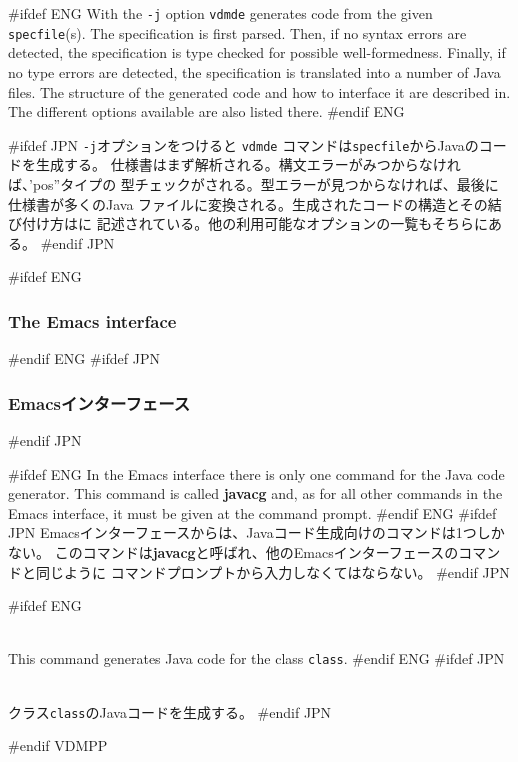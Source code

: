 \documentclass[\pformat,12pt]{article}
\newcommand{\vdmde}{vdmde}
\newcommand{\vdmde}{vppde}
\begin{document}
#ifdef ENG
With the {\tt -j} option {\tt \vdmde} generates code from the given
{\tt specfile}(s). The specification is first parsed. Then, if no
syntax errors are detected, the specification is type checked for
possible well-formedness. Finally,
if no type errors are detected, the specification is translated into a
number of Java files. The structure of the generated
code and how to interface it are described in\cite{CGJavaManPP-CSK}. The
different options available are also listed there.
#endif ENG

#ifdef JPN
{\tt -j}オプションをつけると {\tt \vdmde} コマンドは{\tt specfile}からJavaのコードを生成する。
仕様書はまず解析される。構文エラーがみつからなければ、'pos''タイプの 
型チェックがされる。型エラーが見つからなければ、最後に仕様書が多くのJava
ファイルに変換される。生成されたコードの構造とその結び付け方は\cite{CGJavaManPP-CSK}に
記述されている。他の利用可能なオプションの一覧もそちらにある。
#endif JPN

#ifdef ENG
\subsubsection{The Emacs interface}
#endif ENG
#ifdef JPN
\subsubsection{Emacsインターフェース}
#endif JPN

#ifdef ENG
In the Emacs interface there is only one command for the Java code generator.
This command is called \textbf{javacg}
and, as for all other commands in the Emacs interface, it must be given at
the command prompt.
#endif ENG
#ifdef JPN
Emacsインターフェースからは、Javaコード生成向けのコマンドは1つしかない。
このコマンドは\textbf{javacg}と呼ばれ、他のEmacsインターフェースのコマンドと同じように
コマンドプロンプトから入力しなくてはならない。
#endif JPN

\begin{description}
#ifdef ENG
\item[*javacg (jcg) {\tt class} {[}{\tt options}{]}]   \mbox{}\\
  This command generates Java code for the class {\tt class}.
#endif ENG
#ifdef JPN
\item[*javacg (jcg) {\tt class} {[}{\tt options}{]}] 
  \mbox{}\\
  クラス{\tt class}のJavaコードを生成する。
#endif JPN
\end{description}
#endif VDMPP
\end{document}

